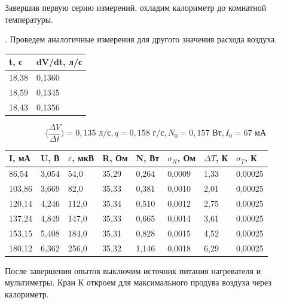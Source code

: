 \documentclass[a4paper,12pt]{article} %
\begin{document}
\noindent Завершив первую серию измерений, охладим калориметр до комнатной температуры.

\medskip

. Проведем аналогичные измерения для другого значения расхода воздуха.

\begin{table}[h!]
\begin{tabular}{|l|l|}
\hline
t, с  & dV/dt, л/с \\ \hline
18,38 & 0,1360     \\ \hline
18,59 & 0,1345     \\ \hline
18,43 & 0,1356     \\ \hline
\end{tabular}
\end{table}

$$\langle\frac{\Delta V}{\Delta t}\rangle = 0,135\text{ л/с}, q = 0,158 \text{ г/с}, N_0 = 0,157 \text{ Вт}, I_0 = 67 \text{ мА}$$

\begin{table}[h!]
\begin{tabular}{|l|l|l|l|l|l|l|l|}
\hline
I, мА  & U, В  & $\varepsilon$, мкВ & R, Ом & N, Вт & $\sigma_N$,    Ом & $\Delta T$, К & $\sigma_T$, К \\ \hline
86,54  & 3,054 & 54,0               & 35,29 & 0,264 & 0,0009            & 1,33          & 0,00025       \\ \hline
103,86 & 3,669 & 82,0               & 35,33 & 0,381 & 0,0010            & 2,01          & 0,00025       \\ \hline
120,14 & 4,246 & 112,0              & 35,34 & 0,510 & 0,0012            & 2,75          & 0,00025       \\ \hline
137,24 & 4,849 & 147,0              & 35,33 & 0,665 & 0,0014            & 3,61          & 0,00025       \\ \hline
153,15 & 5,408 & 184,0              & 35,31 & 0,828 & 0,0015            & 4,52          & 0,00025       \\ \hline
180,12 & 6,362 & 256,0              & 35,32 & 1,146 & 0,0018            & 6,29          & 0,00025       \\ \hline
\end{tabular}
\end{table}

\noindent После завершения опытов выключим источник питания нагревателя и мультиметры. Кран К откроем для максимального продува воздуха через калориметр.

\medskip
\end{document}
